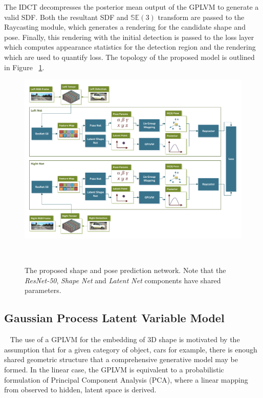 The IDCT decompresses the posterior mean output of the GPLVM to generate a valid SDF\@. Both the 
resultant SDF and \( \mathbb{SE}(3) \) transform are passed to the Raycasting module, which generates 
a rendering for the candidate shape and pose. Finally, this rendering with the initial detection is passed 
to the loss layer which computes appearance statistics for the detection region and the rendering 
which are used to quantify loss. The topology of the proposed model is outlined in Figure
~\ref{figure:spp_pipeline}.
\begin{landscape}
  \begin{figure}[!htbp]
    \centering
    \includegraphics[width=.9\linewidth]{figures/spp/model.pdf}
    \caption[Shape and Pose Prediction Network]{The proposed shape and pose prediction network. 
    Note that the \textit{ResNet-50}, \textit{Shape Net} and \textit{Latent Net} components have 
    shared parameters.}
~\label{figure:spp_pipeline}
  \end{figure}
\end{landscape}

\subsection{Gaussian Process Latent Variable Model}
~\label{subsec:spp_gplvm}
The use of a GPLVM for the embedding of 3D shape is motivated by the assumption that for a 
given category of object, cars for example, there is enough shared geometric structure that 
a comprehensive generative model may be formed. In the linear case, the GPLVM is equivalent 
to a probabilistic formulation of Principal Component Analysis (PCA), where a linear mapping 
from observed to hidden, latent space is derived. 

